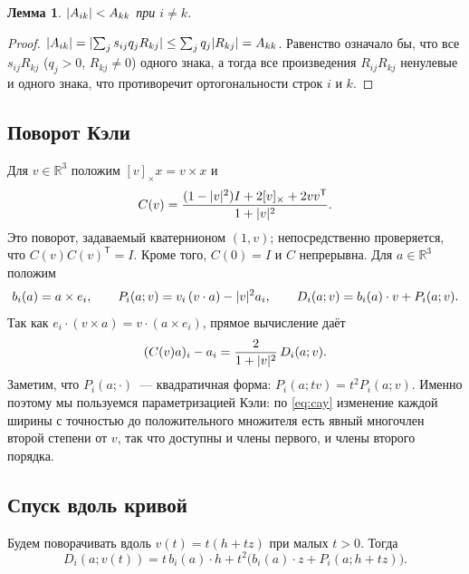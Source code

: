 \documentclass[11pt]{article}
\newtheorem{lemma}[theorem]{Лемма}
\theoremstyle{definition}
\theoremstyle{remark}
\newcommand{\R}{\mathbb{R}}
\DeclarePairedDelimiter{\abs}{\lvert}{\rvert}
\begin{document}
\begin{lemma}\label{lem:B1}
$\abs{A_{ik}}<A_{kk}$ при $i\neq k$.
\end{lemma}
\begin{proof}
$\abs{A_{ik}}=\abs{\sum_j s_{ij}q_jR_{kj}}\le\sum_jq_j\abs{R_{kj}}=A_{kk}$. Равенство означало бы,
что все $s_{ij}R_{kj}$ ($q_j>0$, $R_{kj}\ne0$) одного знака, а тогда все произведения
$R_{ij}R_{kj}$ ненулевые и одного знака, что противоречит ортогональности строк $i$ и $k$.
\end{proof}

\subsection{Поворот Кэли}
Для $v\in\R^3$ положим $[v]_\times x=v\times x$ и
\[
C(v)=\frac{(1-\abs{v}^2)I+2[v]_\times+2vv^{\mathsf T}}{1+\abs{v}^2}.
\]
Это поворот, задаваемый кватернионом $(1,v)$; непосредственно проверяется, что
$C(v)C(v)^{\mathsf T}=I$. Кроме того, $C(0)=I$ и $C$ непрерывна. Для $a\in\R^3$ положим
\[
b_i(a)=a\times e_i,\qquad P_i(a;v)=v_i\,(v\cdot a)-\abs{v}^2a_i,\qquad D_i(a;v)=b_i(a)\cdot v+P_i(a;v).
\]
Так как $e_i\cdot(v\times a)=v\cdot(a\times e_i)$, прямое вычисление даёт
\begin{equation}\label{eq:cay}
(C(v)a)_i-a_i=\frac{2}{1+\abs{v}^2}\,D_i(a;v).
\end{equation}
Заметим, что $P_i(a;\cdot)$~--- квадратичная форма: $P_i(a;tv)=t^2P_i(a;v)$. Именно поэтому мы
пользуемся параметризацией Кэли: по \eqref{eq:cay} изменение каждой ширины с точностью до
положительного множителя есть явный многочлен второй степени от $v$, так что доступны и члены
первого, и члены второго порядка.

\subsection{Спуск вдоль кривой}
Будем поворачивать вдоль $v(t)=t(h+tz)$ при малых $t>0$. Тогда
\begin{equation}\label{eq:curve}
D_i(a;v(t))=t\,b_i(a)\cdot h+t^2\bigl(b_i(a)\cdot z+P_i(a;h+tz)\bigr).
\end{equation}
\end{document}
